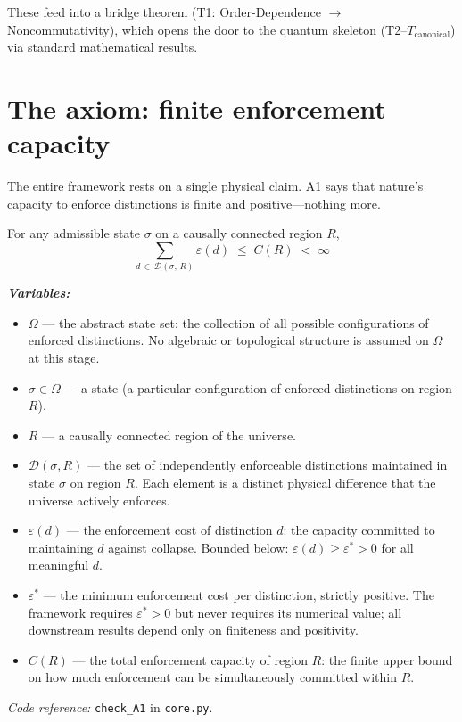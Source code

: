 \documentclass[11pt]{article}
\newenvironment{varlist}{\begin{itemize}[nosep,leftmargin=2em]}{\end{itemize}}
\newcommand{\coderef}[2]{\smallskip\noindent\textit{Code reference:} \texttt{#1} in \texttt{#2}.}
\begin{document}
These feed into a bridge theorem (T1: Order-Dependence $\to$ Noncommutativity), which opens the door to the quantum skeleton (T2--$T_{\mathrm{canonical}}$) via standard mathematical results.

\section{The axiom: finite enforcement capacity}

The entire framework rests on a single physical claim.  A1 says that nature's capacity to enforce distinctions is finite and positive---nothing more.

\begin{tcolorbox}[apfbox, title={Axiom A1 (Finite Enforcement Capacity)}]
For any admissible state $\sigma$ on a causally connected region $R$,
\begin{equation}
\sum_{d \,\in\, \mathcal{D}(\sigma,\,R)} \varepsilon(d) \;\le\; C(R) \;<\; \infty
\end{equation}

\smallskip\noindent\textbf{\textit{Variables:}}
\begin{varlist}
\item $\Omega$ --- the abstract state set: the collection of all possible configurations of enforced distinctions.  No algebraic or topological structure is assumed on $\Omega$ at this stage.
\item $\sigma \in \Omega$ --- a state (a particular configuration of enforced distinctions on region $R$).
\item $R$ --- a causally connected region of the universe.
\item $\mathcal{D}(\sigma,R)$ --- the set of independently enforceable distinctions maintained in state $\sigma$ on region $R$.  Each element is a distinct physical difference that the universe actively enforces.
\item $\varepsilon(d)$ --- the enforcement cost of distinction $d$: the capacity committed to maintaining $d$ against collapse.  Bounded below: $\varepsilon(d) \ge \varepsilon^* > 0$ for all meaningful $d$.
\item $\varepsilon^*$ --- the minimum enforcement cost per distinction, strictly positive.  The framework requires $\varepsilon^* > 0$ but never requires its numerical value; all downstream results depend only on finiteness and positivity.
\item $C(R)$ --- the total enforcement capacity of region $R$: the finite upper bound on how much enforcement can be simultaneously committed within $R$.
\end{varlist}

\coderef{check\_A1}{core.py}
\end{tcolorbox}
\end{document}
